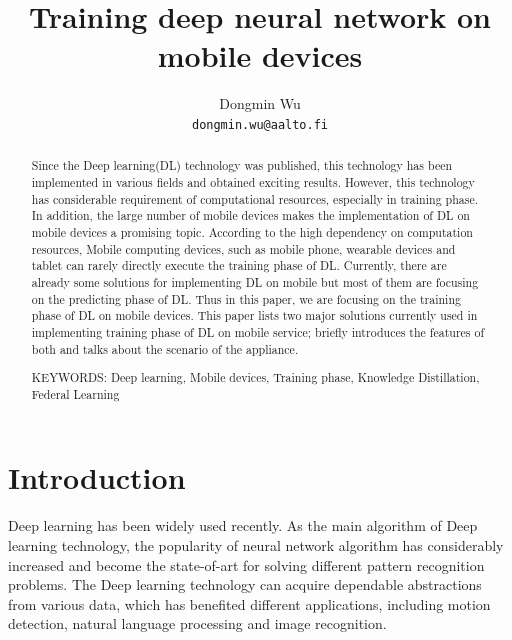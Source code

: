 \documentclass[article]{aaltoseries}
\begin{document}
 

\title{Training deep neural network on mobile devices}

\author{Dongmin Wu
\\\textnormal{\texttt{dongmin.wu@aalto.fi}}} %


\maketitle


\begin{abstract}


  Since the Deep learning(DL) technology was published, this technology has been
  implemented in various fields and obtained exciting results. 
  However, this technology has considerable requirement of computational resources, especially
  in training phase. In addition, the large number of mobile devices makes the implementation
  of DL on mobile devices a promising topic. 
 According to the high dependency on computation resources,
 Mobile computing devices, such as mobile phone,
  wearable devices and tablet can rarely directly execute the training phase of DL. 
 Currently, there are already some solutions for implementing DL on mobile\cite{Ota:2017}
 but most of them are focusing on the predicting phase of DL. 
 Thus in this paper, we are focusing on the training phase of DL on mobile devices.
 This paper lists two major solutions currently used in implementing training phase of DL on mobile service;
 briefly introduces the features of both and talks about the scenario of the appliance. 


\vspace{3mm}
\noindent KEYWORDS: Deep learning, Mobile devices, Training phase, Knowledge Distillation, Federal Learning

\end{abstract}




\section{Introduction}


Deep learning has been widely used recently. As the main algorithm of Deep learning technology,
 the popularity of neural network algorithm 
 has considerably increased and become the state-of-art for solving different pattern recognition
problems.
The Deep learning technology can acquire 
  dependable abstractions from various data, which has benefited different applications, 
  including motion detection, natural language processing and image recognition. 
\end{document}
